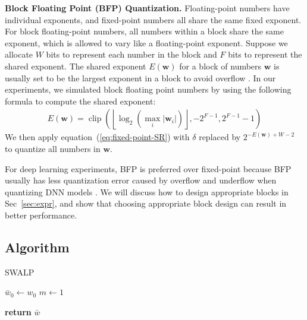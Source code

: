 \documentclass{article}
\begin{document}
\textbf{Block Floating Point (BFP) Quantization.}
Floating-point numbers have individual exponents, and fixed-point numbers all share the same fixed exponent.
For block floating-point numbers, all numbers within a block share the same exponent, which is allowed to vary like a floating-point exponent.
Suppose we allocate $W$ bits to represent each number in the block and $F$ bits to represent the shared exponent.
The shared exponent $E(\mathbf{w})$ for a block of numbers $\mathbf{w}$ is usually set to be the largest exponent in a block to avoid overflow \cite{error-analysis,Mixed-precision-training}. 
In our experiments, we simulated block floating point numbers by using the following formula to compute the shared exponent:
\begin{align*}
{\textstyle
E(\mathbf{w}) = \operatorname{clip}(\left \lfloor \log_2(\max_i|\mathbf{w}_i|)\right \rfloor, -2^{F-1}, 2^{F-1}-1)    
}
\end{align*}
We then apply equation~(\ref{eq:fixed-point-SR}) with $\delta$ replaced by $2^{-E(\mathbf{w}) + W - 2}$ to quantize all numbers in $\mathbf{w}$.

For deep learning experiments, BFP is preferred over fixed-point because BFP usually has less quantization error caused by overflow and underflow when quantizing DNN models \cite{error-analysis}.
We will discuss how to design appropriate blocks in Sec~\ref{sec:expr}, and show that choosing appropriate block design can result in better performance.

\subsection{Algorithm}\label{sec:method-algo}

\begin{algorithm}[t]
  \caption{SWALP}
  \label{alg:SWALP}
\begin{algorithmic}
\STATE $\bar{w}_0 \leftarrow w_0$ 
\STATE $m \leftarrow 1$ 

         
    \ENDIF\ENDFOR
\STATE \textbf{return} $\bar{w}$
\end{algorithmic}
\end{algorithm}
\end{document}
